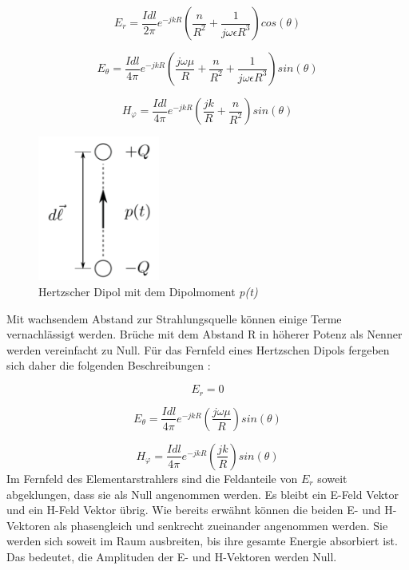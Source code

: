 \begin{equation}
E_r= \frac{I dl}{2\pi}   e^{-jkR} \left( \frac{n}{R^{2}}  + \frac{1}{j\omega \epsilon R^{3}}\right) cos(\theta)
\end{equation}

\begin{equation}
E_\theta= \frac{I dl}{4\pi}   e^{-jkR} \left( \frac{j\omega \mu}{R}  + \frac{n}{R^{2}}+ \frac{1}{j\omega \epsilon R^{3}}\right) sin(\theta)
\end{equation}

\begin{equation}
H_\varphi= \frac{I dl}{4\pi}   e^{-jkR} \left( \frac{jk}{R}  + \frac{n}{R^{2}}\right) sin(\theta)
\end{equation}

\begin{figure}[!ht]
	\centering
	\includegraphics[width=4cm]{content/bilder/HerzDipolEMANTS37.pdf}%
	\caption{Hertzscher Dipol mit dem Dipolmoment \textit{p(t)} \cite{Emant}}
	\label{HerzDipol}
\end{figure}


Mit wachsendem Abstand zur Strahlungsquelle können einige Terme vernachlässigt werden. Brüche mit dem  Abstand R in höherer Potenz als Nenner werden vereinfacht zu Null. Für das Fernfeld eines Hertzschen Dipols fergeben sich daher die folgenden Beschreibungen \cite{elliott1981antenna}:


\begin{equation}
E_r= 0
\end{equation}

\begin{equation}
E_\theta= \frac{I dl}{4\pi}   e^{-jkR} \left( \frac{j\omega \mu}{R}  \right) sin(\theta)
\end{equation}

\begin{equation}
H_\varphi= \frac{I dl}{4\pi}   e^{-jkR} \left( \frac{jk}{R} \right) sin(\theta)
\end{equation}
Im Fernfeld des Elementarstrahlers sind die Feldanteile von $E_r$ soweit abgeklungen, dass sie als Null angenommen werden. Es bleibt ein E-Feld Vektor und ein H-Feld Vektor übrig. Wie bereits erwähnt können die beiden E- und H-Vektoren als phasengleich und senkrecht zueinander angenommen werden. Sie werden sich soweit im Raum ausbreiten, bis ihre gesamte Energie absorbiert ist. Das bedeutet, die Amplituden der E- und H-Vektoren werden Null.\\


